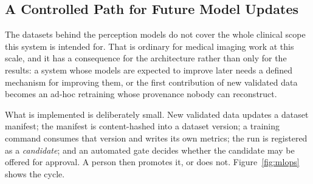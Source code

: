 \subsection{A Controlled Path for Future Model Updates}
\label{subsec:mlops}

The datasets behind the perception models do not cover the whole clinical scope this system is
intended for. That is ordinary for medical imaging work at this scale, and it has a
consequence for the architecture rather than only for the results: a system whose models are
expected to improve later needs a defined mechanism for improving them, or the first
contribution of new validated data becomes an ad-hoc retraining whose provenance nobody can
reconstruct.

What is implemented is deliberately small. New validated data updates a dataset manifest; the
manifest is content-hashed into a dataset version; a training command consumes that version
and writes its own metrics; the run is registered as a \emph{candidate}; and an automated gate
decides whether the candidate may be offered for approval. A person then promotes it, or does
not. Figure~\ref{fig:mlops} shows the cycle.

